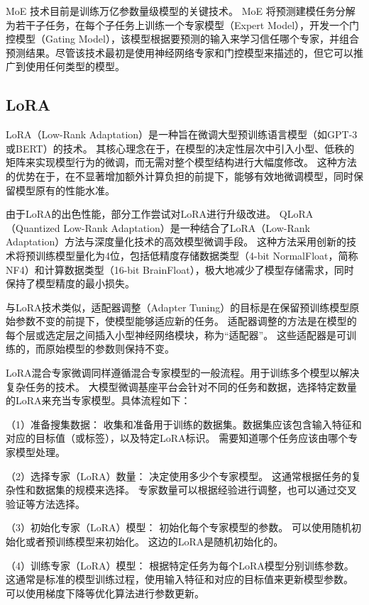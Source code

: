 MoE 技术目前是训练万亿参数量级模型的关键技术。
MoE 将预测建模任务分解为若干子任务，在每个子任务上训练一个专家模型（Expert Model），开发一个门控模型（Gating Model），该模型根据要预测的输入来学习信任哪个专家，并组合预测结果。尽管该技术最初是使用神经网络专家和门控模型来描述的，但它可以推广到使用任何类型的模型。

\subsection{LoRA}

LoRA（Low-Rank Adaptation）是一种旨在微调大型预训练语言模型（如GPT-3或BERT）的技术。
其核心理念在于，在模型的决定性层次中引入小型、低秩的矩阵来实现模型行为的微调，而无需对整个模型结构进行大幅度修改。
这种方法的优势在于，在不显著增加额外计算负担的前提下，能够有效地微调模型，同时保留模型原有的性能水准。

由于LoRA的出色性能，部分工作尝试对LoRA进行升级改进。
QLoRA（Quantized Low-Rank Adaptation）是一种结合了LoRA（Low-Rank Adaptation）方法与深度量化技术的高效模型微调手段。
这种方法采用创新的技术将预训练模型量化为4位，包括低精度存储数据类型（4-bit NormalFloat，简称NF4）和计算数据类型（16-bit BrainFloat），极大地减少了模型存储需求，同时保持了模型精度的最小损失。

与LoRA技术类似，适配器调整（Adapter Tuning）的目标是在保留预训练模型原始参数不变的前提下，使模型能够适应新的任务。
适配器调整的方法是在模型的每个层或选定层之间插入小型神经网络模块，称为“适配器”。
这些适配器是可训练的，而原始模型的参数则保持不变。

LoRA混合专家微调同样遵循混合专家模型的一般流程。用于训练多个模型以解决复杂任务的技术。
大模型微调基座平台会针对不同的任务和数据，选择特定数量的LoRA来充当专家模型。具体流程如下：

（1）准备搜集数据：
收集和准备用于训练的数据集。数据集应该包含输入特征和对应的目标值（或标签），以及特定LoRA标识。
需要知道哪个任务应该由哪个专家模型处理。

（2）选择专家（LoRA）数量：
决定使用多少个专家模型。
这通常根据任务的复杂性和数据集的规模来选择。
专家数量可以根据经验进行调整，也可以通过交叉验证等方法选择。

（3）初始化专家（LoRA）模型：
初始化每个专家模型的参数。
可以使用随机初始化或者预训练模型来初始化。
这边的LoRA是随机初始化的。

（4）训练专家（LoRA）模型：
根据特定任务为每个LoRA模型分别训练参数。
这通常是标准的模型训练过程，使用输入特征和对应的目标值来更新模型参数。
可以使用梯度下降等优化算法进行参数更新。

